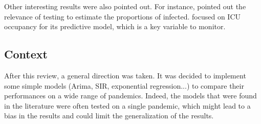 Other interesting results were also pointed out. 
For instance, \cite{hult2020estimates} pointed out the relevance of testing to estimate the proportions of infected. 
\cite{sjodin2020covid} focused on ICU occupancy for its predictive model, which is a key variable to monitor. 

\subsection{Context}

After this review, a general direction was taken. 
It was decided to implement some simple models (Arima, SIR, exponential regression...) to compare their performances on a wide range of pandemics. 
Indeed, the models that were found in the literature were often tested on a single pandemic, which might lead to a bias in the results and could limit the generalization of the results.
